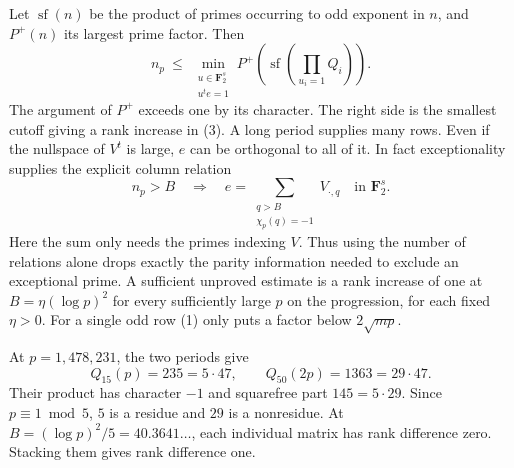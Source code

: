 \documentclass[11pt]{article}
\newcommand{\ch}{\chi_p}
\newcommand{\F}{\mathbf F_2}
\begin{document}
Let \(\operatorname{sf}(n)\) be the product of primes occurring to odd
exponent in \(n\), and \(P^+(n)\) its largest prime factor. Then
\begin{equation}
 n_p\ \le\ \min_{\substack{u\in\F^s\\ u^te=1}}
       P^+\!\left(\operatorname{sf}\left(\prod_{u_i=1}Q_i\right)\right).
\end{equation}
The argument of \(P^+\) exceeds one by its character. The right side is the
smallest cutoff giving a rank increase in (3). A long period supplies many
rows. Even if the nullspace of \(V^t\) is large, \(e\) can be orthogonal to
all of it. In fact exceptionality supplies the explicit column relation
\begin{equation}
 n_p>B\quad\Longrightarrow\quad
 e=\sum_{\substack{q>B\\ \ch(q)=-1}} V_{\cdot,q}\quad\text{in }\F^s .
\end{equation}
Here the sum only needs the primes indexing \(V\). Thus using the number
of relations alone drops exactly the parity information needed to exclude
an exceptional prime. A sufficient unproved estimate is a rank increase of
one at \(B=\eta(\log p)^2\) for every sufficiently large \(p\) on the
progression, for each fixed \(\eta>0\). For a single odd row (1) only
puts a factor below \(2\sqrt{mp}\).

At \(p=1{,}478{,}231\), the two periods give
\[
 Q_{15}(p)=235=5\cdot47,\qquad Q_{50}(2p)=1363=29\cdot47.
\]
Their product has character \(-1\) and squarefree part \(145=5\cdot29\).
Since \(p\equiv1\bmod5\), \(5\) is a residue and \(29\) is a nonresidue.
At \(B=(\log p)^2/5=40.3641\ldots\), each individual matrix has rank
difference zero. Stacking them gives rank difference one.

\newpage
\end{document}
